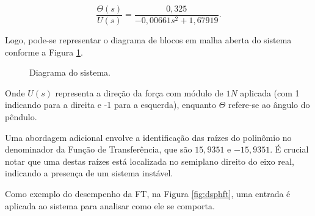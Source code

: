 \documentclass[12pt,           %
a4paper,                       %
openany,                       %
oneside,                       %
chapter=TITLE,                 %
english,                       %
spanish,                       %
brazil,                        %
sumario=tradicional]{abntex2}  %
\begin{document}
\begin{OnehalfSpace}
\begin{equation}
     \frac{\Theta (s)}{U(s)} = \frac{0,325}{-0,00661s^2 +  1,67919}.
    \label{eq:31}
\end{equation}

Logo, pode-se representar o diagrama de blocos em malha aberta do sistema conforme a Figura \ref{fig:dbft}.

\begin{figure}[H]
\centering
\vspace*{-.2cm}
\caption{Diagrama do sistema.}
\label{blocos}
\label{fig:dbft}
\end{figure}
\vspace*{-.65cm}
{\raggedright {}}

Onde $U(s)$ representa a direção da força com módulo de $1N$ aplicada (com 1 indicando para a direita e -1 para a esquerda), enquanto $\Theta$ refere-se ao ângulo do pêndulo.

Uma abordagem adicional envolve a identificação das raízes do polinômio no denominador da Função de Transferência, que são $15,9351$ e $-15,9351$. É crucial notar que uma destas raízes está localizada no semiplano direito do eixo real, indicando a presença de um sistema instável.

Como exemplo do desempenho da FT, na Figura \ref{fig:dsphft}, uma entrada é aplicada ao sistema para analisar como ele se comporta.


\end{OnehalfSpace}
\end{document}
